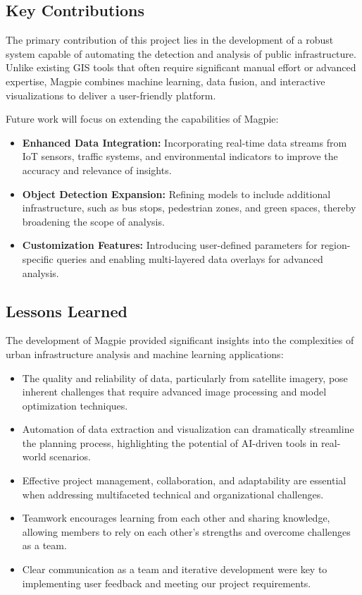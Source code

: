 \subsection{Key Contributions}
The primary contribution of this project lies in the development of a robust
system capable of automating the detection and analysis of public
infrastructure. Unlike existing GIS tools that often require significant manual
effort or advanced expertise, Magpie combines machine learning, data fusion, and
interactive visualizations to deliver a user-friendly platform.

Future work will focus on extending the capabilities of Magpie:
\begin{itemize}
    \item \textbf{Enhanced Data Integration:} Incorporating real-time data
    streams from IoT sensors, traffic systems, and environmental indicators to
    improve the accuracy and relevance of insights.
    \item \textbf{Object Detection Expansion:} Refining models to include
    additional infrastructure, such as bus stops, pedestrian zones, and green
    spaces, thereby broadening the scope of analysis.
    \item \textbf{Customization Features:} Introducing user-defined parameters
    for region-specific queries and enabling multi-layered data overlays for
    advanced analysis.
\end{itemize}

\subsection{Lessons Learned}
The development of Magpie provided significant insights into the complexities of
urban infrastructure analysis and machine learning applications:
\begin{itemize}
    \item The quality and reliability of data, particularly from satellite
    imagery, pose inherent challenges that require advanced image processing and
    model optimization techniques.
    \item Automation of data extraction and visualization can dramatically
    streamline the planning process, highlighting the potential of AI-driven
    tools in real-world scenarios.
    \item Effective project management, collaboration, and adaptability are
    essential when addressing multifaceted technical and organizational
    challenges.
    \item Teamwork encourages learning from each other and sharing knowledge, allowing
    members to rely on each other's strengths and overcome challenges as a team.
    \item Clear communication as a team and iterative development were key to implementing 
    user feedback and meeting our project requirements.
\end{itemize}

